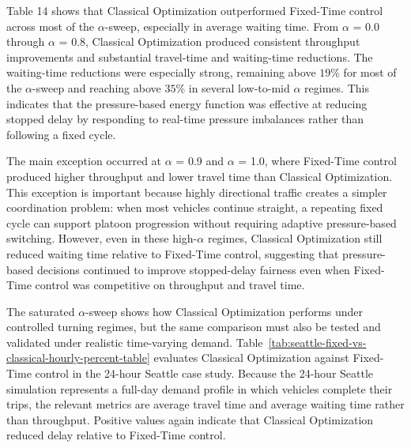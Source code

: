 \documentclass[12pt]{article}
\begin{document}
Table 14 shows that Classical Optimization outperformed Fixed-Time control across most of the $\alpha$-sweep, especially in average waiting time. From $\alpha$ = 0.0 through $\alpha$ = 0.8, Classical Optimization produced consistent throughput improvements and substantial travel-time and waiting-time reductions. The waiting-time reductions were especially strong, remaining above $19\%$ for most of the $\alpha$-sweep and reaching above $35\%$ in several low-to-mid $\alpha$ regimes. This indicates that the pressure-based energy function was effective at reducing stopped delay by responding to real-time pressure imbalances rather than following a fixed cycle.

The main exception occurred at $\alpha$ = 0.9 and $\alpha$ = 1.0, where Fixed-Time control produced higher throughput and lower travel time than Classical Optimization. This exception is important because highly directional traffic creates a simpler coordination problem: when most vehicles continue straight, a repeating fixed cycle can support platoon progression without requiring adaptive pressure-based switching. However, even in these high-$\alpha$ regimes, Classical Optimization still reduced waiting time relative to Fixed-Time control, suggesting that pressure-based decisions continued to improve stopped-delay fairness even when Fixed-Time control was competitive on throughput and travel time.

The saturated $\alpha$-sweep shows how Classical Optimization performs under controlled turning regimes, but the same comparison must also be tested and validated under realistic time-varying demand. Table~\ref{tab:seattle-fixed-vs-classical-hourly-percent-table} evaluates Classical Optimization against Fixed-Time control in the 24-hour Seattle case study. Because the 24-hour Seattle simulation represents a full-day demand profile in which vehicles complete their trips, the relevant metrics are average travel time and average waiting time rather than throughput. Positive values again indicate that Classical Optimization reduced delay relative to Fixed-Time control.
\end{document}

